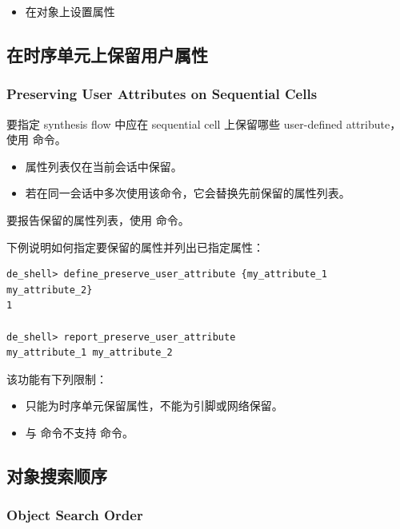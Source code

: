 \begin{seeAlsoBox}
\begin{itemize}
  \item 在对象上设置属性
\end{itemize}
\end{seeAlsoBox}

\subsection{在时序单元上保留用户属性}
\subsubsection*{Preserving User Attributes on Sequential Cells}

要指定 synthesis flow 中应在 sequential cell 上保留哪些 user-defined attribute，使用  命令。

\begin{noteBox}
\begin{itemize}
  \item 属性列表仅在当前会话中保留。
  \item 若在同一会话中多次使用该命令，它会替换先前保留的属性列表。
\end{itemize}
\end{noteBox}

要报告保留的属性列表，使用  命令。

下例说明如何指定要保留的属性并列出已指定属性：
\begin{lstlisting}
de_shell> define_preserve_user_attribute {my_attribute_1 my_attribute_2}
1

de_shell> report_preserve_user_attribute
my_attribute_1 my_attribute_2
\end{lstlisting}

该功能有下列限制：
\begin{itemize}
  \item 只能为时序单元保留属性，不能为引脚或网络保留。
  \item {} 与  命令不支持  命令。
\end{itemize}

\subsection{对象搜索顺序}
\subsubsection*{Object Search Order}

